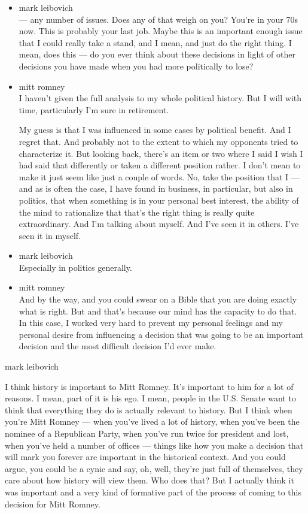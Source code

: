 \begin{itemize}
\item
  mark leibovich\\
  --- any number of issues. Does any of that weigh on you? You're in
  your 70s now. This is probably your last job. Maybe this is an
  important enough issue that I could really take a stand, and I mean,
  and just do the right thing. I mean, does this --- do you ever think
  about these decisions in light of other decisions you have made when
  you had more politically to lose?
\item
  mitt romney\\
  I haven't given the full analysis to my whole political history. But I
  will with time, particularly I'm sure in retirement.

  My guess is that I was influenced in some cases by political benefit.
  And I regret that. And probably not to the extent to which my
  opponents tried to characterize it. But looking back, there's an item
  or two where I said I wish I had said that differently or taken a
  different position rather. I don't mean to make it just seem like just
  a couple of words. No, take the position that I --- and as is often
  the case, I have found in business, in particular, but also in
  politics, that when something is in your personal best interest, the
  ability of the mind to rationalize that that's the right thing is
  really quite extraordinary. And I'm talking about myself. And I've
  seen it in others. I've seen it in myself.
\item
  mark leibovich\\
  Especially in politics generally.
\item
  mitt romney\\
  And by the way, and you could swear on a Bible that you are doing
  exactly what is right. But and that's because our mind has the
  capacity to do that. In this case, I worked very hard to prevent my
  personal feelings and my personal desire from influencing a decision
  that was going to be an important decision and the most difficult
  decision I'd ever make.
\end{itemize}

mark leibovich

I think history is important to Mitt Romney. It's important to him for a
lot of reasons. I mean, part of it is his ego. I mean, people in the
U.S. Senate want to think that everything they do is actually relevant
to history. But I think when you're Mitt Romney --- when you've lived a
lot of history, when you've been the nominee of a Republican Party, when
you've run twice for president and lost, when you've held a number of
offices --- things like how you make a decision that will mark you
forever are important in the historical context. And you could argue,
you could be a cynic and say, oh, well, they're just full of themselves,
they care about how history will view them. Who does that? But I
actually think it was important and a very kind of formative part of the
process of coming to this decision for Mitt Romney.

